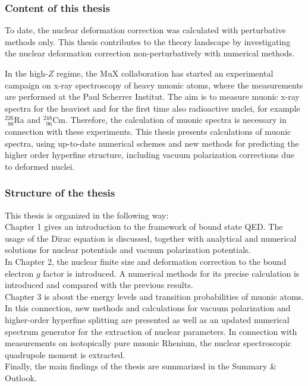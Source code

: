 \subsubsection*{Content of this thesis}
To date, the nuclear deformation correction was calculated with perturbative methods only. This thesis contributes to the theory landscape by investigating the nuclear deformation correction non-perturbatively with numerical methods.

In the high-$Z$ regime, the MuX collaboration has started an experimental campaign on x-ray spectroscopy of heavy muonic atoms, where the measurements are performed at the Paul Scherrer Institut. 
The aim is to measure muonic x-ray spectra for the heaviest and for the first time also radioactive nuclei, for example $^{226}_{\phantom{1}88}$Ra and $^{248}_{\phantom{1}96}$Cm. 
Therefore, the calculation of muonic spectra is necessary in connection with these experiments. This thesis presents calculations of muonic spectra, using up-to-date numerical schemes and new methods for predicting the higher order hyperfine structure, including vacuum polarization corrections due to deformed nuclei.

\subsubsection*{Structure of the thesis}

This thesis is organized in the following way:\\
Chapter 1 gives an introduction to the framework of bound state QED. The usage of the Dirac equation is discussed, together with analytical and numerical solutions for nuclear potentials and vacuum polarization potentials.\\
In Chapter 2, the nuclear finite size and deformation correction to the bound electron $g$ factor is introduced. A numerical methods for its precise calculation is introduced and compared with the previous results.\\
Chapter 3 is about the energy levels and transition probabilities of muonic atoms. In this connection, new methods and calculations for vacuum polarization and higher-order hyperfine splitting are presented as well as an updated numerical spectrum generator for the extraction of nuclear parameters. In connection with measurements on isotopically pure muonic Rhenium, the nuclear spectroscopic quadrupole moment is extracted.\\
Finally, the main findings of the thesis are summarized in the Summary \& Outlook.




































